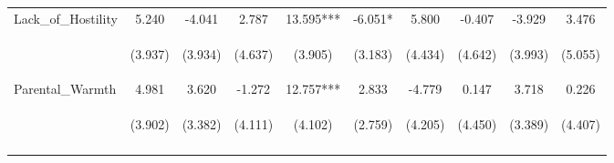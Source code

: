 \begin{tabular}{lccccccccc}
\noalign{\smallskip}Lack_of_Hostility & 5.240 & -4.041 & 2.787 & 13.595*** & -6.051* & 5.800 & -0.407 & -3.929 & 3.476\\
 & \begin{footnotesize}(3.937)\end{footnotesize} & \begin{footnotesize}(3.934)\end{footnotesize} & \begin{footnotesize}(4.637)\end{footnotesize} & \begin{footnotesize}(3.905)\end{footnotesize} & \begin{footnotesize}(3.183)\end{footnotesize} & \begin{footnotesize}(4.434)\end{footnotesize} & \begin{footnotesize}(4.642)\end{footnotesize} & \begin{footnotesize}(3.993)\end{footnotesize} & \begin{footnotesize}(5.055)\end{footnotesize}\\
\noalign{\smallskip}Parental_Warmth & 4.981 & 3.620 & -1.272 & 12.757*** & 2.833 & -4.779 & 0.147 & 3.718 & 0.226\\
 & \begin{footnotesize}(3.902)\end{footnotesize} & \begin{footnotesize}(3.382)\end{footnotesize} & \begin{footnotesize}(4.111)\end{footnotesize} & \begin{footnotesize}(4.102)\end{footnotesize} & \begin{footnotesize}(2.759)\end{footnotesize} & \begin{footnotesize}(4.205)\end{footnotesize} & \begin{footnotesize}(4.450)\end{footnotesize} & \begin{footnotesize}(3.389)\end{footnotesize} & \begin{footnotesize}(4.407)\end{footnotesize}\\
\noalign{\smallskip}\hline\end{tabular}\\
